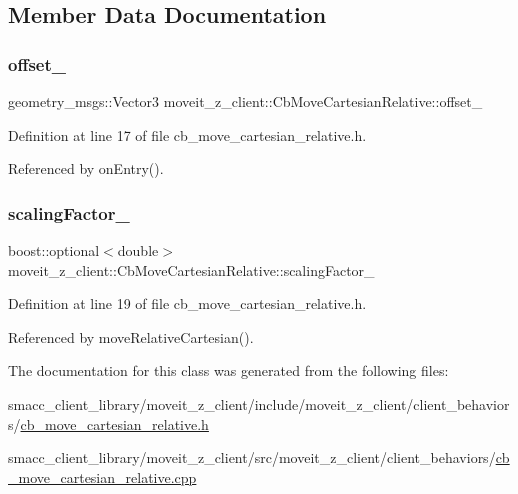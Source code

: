 \subsection{Member Data Documentation}
\mbox{\label{classmoveit__z__client_1_1CbMoveCartesianRelative_aa5316f2f734336722a353a8e9addea95}} 
\subsubsection{\texorpdfstring{offset\+\_\+}{offset\_}}
{\footnotesize\ttfamily geometry\+\_\+msgs\+::\+Vector3 moveit\+\_\+z\+\_\+client\+::\+Cb\+Move\+Cartesian\+Relative\+::offset\+\_\+}



Definition at line 17 of file cb\+\_\+move\+\_\+cartesian\+\_\+relative.\+h.



Referenced by on\+Entry().

\mbox{\label{classmoveit__z__client_1_1CbMoveCartesianRelative_a0d483fda685fe6ef7e68240ae5b2140d}} 
\subsubsection{\texorpdfstring{scaling\+Factor\+\_\+}{scalingFactor\_}}
{\footnotesize\ttfamily boost\+::optional$<$double$>$ moveit\+\_\+z\+\_\+client\+::\+Cb\+Move\+Cartesian\+Relative\+::scaling\+Factor\+\_\+}



Definition at line 19 of file cb\+\_\+move\+\_\+cartesian\+\_\+relative.\+h.



Referenced by move\+Relative\+Cartesian().



The documentation for this class was generated from the following files\+:\begin{DoxyCompactItemize}
\item 
smacc\+\_\+client\+\_\+library/moveit\+\_\+z\+\_\+client/include/moveit\+\_\+z\+\_\+client/client\+\_\+behaviors/\hyperlink{cb__move__cartesian__relative_8h}{cb\+\_\+move\+\_\+cartesian\+\_\+relative.\+h}\item 
smacc\+\_\+client\+\_\+library/moveit\+\_\+z\+\_\+client/src/moveit\+\_\+z\+\_\+client/client\+\_\+behaviors/\hyperlink{cb__move__cartesian__relative_8cpp}{cb\+\_\+move\+\_\+cartesian\+\_\+relative.\+cpp}\end{DoxyCompactItemize}
